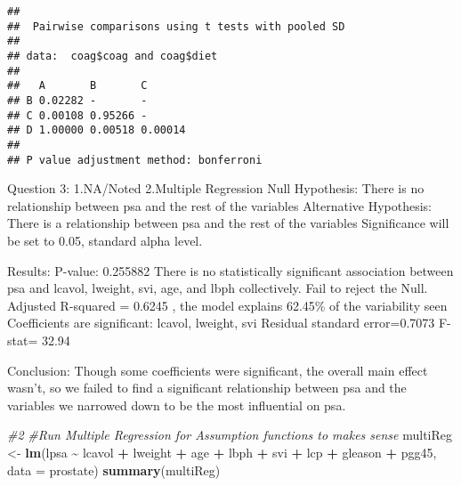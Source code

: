 \documentclass[
]{article}
\newenvironment{Shaded}{\begin{snugshade}}{\end{snugshade}}
\newcommand{\AlertTok}[1]{\textcolor[rgb]{0.94,0.16,0.16}{#1}}
\newcommand{\AttributeTok}[1]{\textcolor[rgb]{0.13,0.29,0.53}{#1}}
\newcommand{\CommentTok}[1]{\textcolor[rgb]{0.56,0.35,0.01}{\textit{#1}}}
\newcommand{\FunctionTok}[1]{\textcolor[rgb]{0.13,0.29,0.53}{\textbf{#1}}}
\newcommand{\NormalTok}[1]{#1}
\newcommand{\OtherTok}[1]{\textcolor[rgb]{0.56,0.35,0.01}{#1}}
\newcommand{\SpecialCharTok}[1]{\textcolor[rgb]{0.81,0.36,0.00}{\textbf{#1}}}
\newcommand{\StringTok}[1]{\textcolor[rgb]{0.31,0.60,0.02}{#1}}
\begin{document}
\begin{Shaded}
\end{Shaded}

\begin{verbatim}
## 
##  Pairwise comparisons using t tests with pooled SD 
## 
## data:  coag$coag and coag$diet 
## 
##   A       B       C      
## B 0.02282 -       -      
## C 0.00108 0.95266 -      
## D 1.00000 0.00518 0.00014
## 
## P value adjustment method: bonferroni
\end{verbatim}

Question 3: 1.NA/Noted 2.Multiple Regression Null Hypothesis: There is
no relationship between psa and the rest of the variables Alternative
Hypothesis: There is a relationship between psa and the rest of the
variables Significance will be set to 0.05, standard alpha level.

Results: P-value: 0.255882 There is no statistically significant
association between psa and lcavol, lweight, svi, age, and lbph
collectively. Fail to reject the Null. Adjusted R-squared = 0.6245 , the
model explains 62.45\% of the variability seen Coefficients are
significant: lcavol, lweight, svi Residual standard error=0.7073 F-stat=
32.94

Conclusion: Though some coefficients were significant, the overall main
effect wasn't, so we failed to find a significant relationship between
psa and the variables we narrowed down to be the most influential on
psa.

\begin{Shaded}
\begin{Highlighting}[]
\CommentTok{\#2 }
\CommentTok{\#Run Multiple Regression for Assumption functions to makes sense}
\NormalTok{multiReg }\OtherTok{\textless{}{-}} \FunctionTok{lm}\NormalTok{(lpsa }\SpecialCharTok{\textasciitilde{}}\NormalTok{ lcavol }\SpecialCharTok{+}\NormalTok{ lweight }\SpecialCharTok{+}\NormalTok{ age }\SpecialCharTok{+}\NormalTok{ lbph }\SpecialCharTok{+}\NormalTok{ svi }\SpecialCharTok{+}\NormalTok{ lcp }\SpecialCharTok{+}\NormalTok{ gleason }\SpecialCharTok{+}\NormalTok{ pgg45, }\AttributeTok{data =}\NormalTok{ prostate)}
\FunctionTok{summary}\NormalTok{(multiReg)}
\end{Highlighting}
\end{Shaded}
\end{document}
